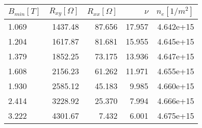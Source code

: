 \begin{tabular}{lrrrr}
\toprule
 $B_{min}[T]$ &    $R_{xy} [\Omega]$ 	&  $R_{xx}[\Omega]$ 	& $\nu$  &$n_e [1/m^2]$\\
\midrule
  1.069 &   1437.48 &   87.656 	&       17.957 &         4.642e+15 \\
  1.204 &   1617.87 &   81.681 	&       15.955 &         4.645e+15 \\
  1.379 &   1852.25 &   73.175 	&       13.936 &         4.647e+15 \\
  1.608 &  2156.23 	&   61.262 	&       11.971 &         4.655e+15 \\
  1.930 & 2585.12 	&    45.183 &        9.985 &         4.660e+15 \\
  2.414 &   3228.92 &    25.370 &        7.994 &         4.666e+15 \\
  3.222 &   4301.67 &     7.432 &        6.001 &         4.675e+15 \\
\bottomrule
\end{tabular}
